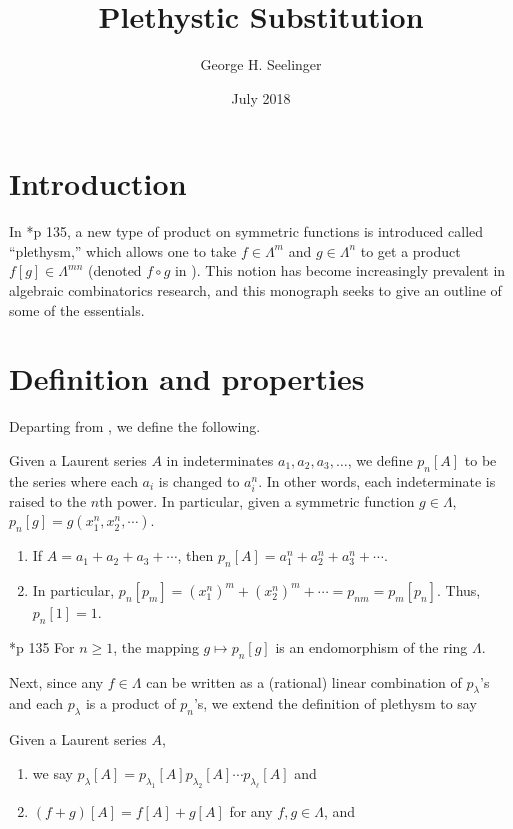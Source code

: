 \documentclass[11pt,leqno,oneside]{amsart}
\title[Plethystic Substitution]{Plethystic Substitution}
\author{George H. Seelinger}
\date{July 2018}
\numberwithin{thm}{section}
\newcommand{\sym}{\Lambda}
\begin{document}
\maketitle
\section{Introduction}
In \cite{macdonald}*{p 135}, a new type of product on symmetric
functions is introduced called ``plethysm,'' which allows one to take
\(f \in \sym^m\) and \(g \in \sym^n\) to get a product \(f[g] \in
\sym^{mn}\) (denoted \(f \circ g\) in \cite{macdonald}). This notion
has become increasingly prevalent in algebraic combinatorics research,
and this monograph seeks to give an outline of some of the essentials.
\section{Definition and properties}
Departing from \cite{macdonald}, we define the following.
\begin{defn}
  Given a Laurent series \(A\) in indeterminates \(a_1, a_2, a_3,
  \ldots\), we define \(p_n[A]\) to be the series where each \(a_i\)
  is changed to \(a_i^n\). In other words, each indeterminate is
  raised to the \(n\)th power. In particular, given a symmetric function
  \(g \in \sym\), \(p_n[g] = g(x_1^n, x_2^n, \cdots)\).
\end{defn}
\begin{example}\label{first-examples}
  \begin{enumerate}
  \item If \(A = a_1+a_2+a_3+\cdots\), then \(p_n[A] =
    a_1^n+a_2^n+a_3^n+\cdots\).
  \item In particular, \(p_n[p_m] = (x_1^n)^m+(x_2^n)^m+\cdots =
    p_{nm} = p_m[p_n]\). Thus, \(p_n[1] = 1\).
  \end{enumerate}
\end{example}
\begin{prop}
  \cite{macdonald}*{p 135} For \(n \geq 1\), the mapping \(g \mapsto
  p_n[g]\) is an endomorphism of the ring \(\sym\).
\end{prop}
Next, since any \(f \in \sym\) can be written as a (rational) linear
combination of \(p_\lambda\)'s and each \(p_\lambda\) is a product of
\(p_n\)'s, we extend the definition of plethysm to say
\begin{defn}
  Given a Laurent series \(A\),
  \begin{enumerate}
  \item we say \(p_\lambda[A] = p_{\lambda_1}[A] p_{\lambda_2}[A]
    \cdots p_{\lambda_\ell}[A]\) and 
  \item\((f+g)[A] = f[A]+g[A]\) for any \(f,g \in \sym\), and
  \end{enumerate}
\end{defn}
\end{document}
